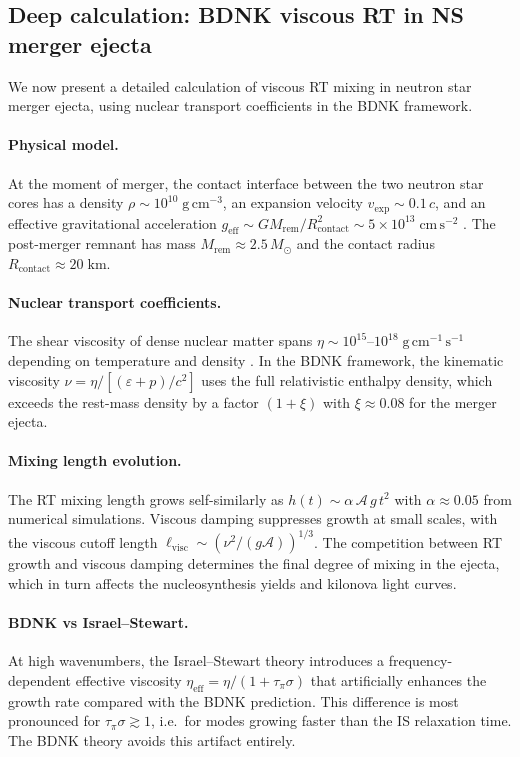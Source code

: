 \subsection{Deep calculation: BDNK viscous RT in NS merger ejecta}
\label{sec:rel-10-94-deep-merger}

We now present a detailed calculation of viscous RT mixing in
neutron star merger ejecta, using nuclear transport coefficients
in the BDNK framework.

\paragraph{Physical model.}
At the moment of merger, the contact interface between the two
neutron star cores has a density $\rho \sim 10^{10}\;\mathrm{g\,cm^{-3}}$,
an expansion velocity $v_{\mathrm{exp}} \sim 0.1\,c$, and an
effective gravitational acceleration
$g_{\mathrm{eff}} \sim GM_{\mathrm{rem}}/R_{\mathrm{contact}}^{2}
\sim 5\times 10^{13}\;\mathrm{cm\,s^{-2}}$ \citep{Radice2018}.
The post-merger remnant has mass $M_{\mathrm{rem}} \approx 2.5\,M_{\odot}$
and the contact radius $R_{\mathrm{contact}} \approx 20\;\mathrm{km}$.

\paragraph{Nuclear transport coefficients.}
The shear viscosity of dense nuclear matter spans
$\eta \sim 10^{15}$--$10^{18}\;\mathrm{g\,cm^{-1}\,s^{-1}}$
depending on temperature and density \citep{Alford2018}.
In the BDNK framework, the kinematic viscosity
$\nu = \eta/[(\varepsilon + p)/c^{2}]$ uses the full relativistic
enthalpy density, which exceeds the rest-mass density by a factor
$(1+\xi)$ with $\xi \approx 0.08$ for the merger ejecta.

\paragraph{Mixing length evolution.}
The RT mixing length grows self-similarly as
$h(t) \sim \alpha\,\mathcal{A}\,g\,t^{2}$ with
$\alpha \approx 0.05$ from numerical simulations.  Viscous
damping suppresses growth at small scales, with the viscous cutoff
length $\ell_{\mathrm{visc}} \sim (\nu^{2}/(g\mathcal{A}))^{1/3}$.
The competition between RT growth and viscous damping determines the
final degree of mixing in the ejecta, which in turn affects the
nucleosynthesis yields and kilonova light curves.

\paragraph{BDNK vs Israel--Stewart.}
At high wavenumbers, the Israel--Stewart theory introduces a
frequency-dependent effective viscosity
$\eta_{\mathrm{eff}} = \eta/(1+\tau_{\pi}\sigma)$ that artificially
enhances the growth rate compared with the BDNK prediction.  This
difference is most pronounced for $\tau_{\pi}\sigma \gtrsim 1$,
i.e.\ for modes growing faster than the IS relaxation time.
The BDNK theory avoids this artifact entirely.

